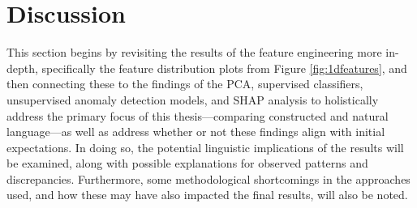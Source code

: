 \documentclass[12pt,a4paper]{article}
\numberwithin{figure}{section}
\numberwithin{table}{section}
\numberwithin{definition}{section}
\begin{document}
\clearpage
\newpage
\section{Discussion}
\label{sec:discussion}



This section begins by revisiting the results of the feature engineering more in-depth, specifically the feature distribution plots from Figure \ref{fig:1dfeatures}, and then connecting these to the findings of the PCA, supervised classifiers, unsupervised anomaly detection models, and SHAP analysis to holistically address the primary focus of this thesis---comparing constructed and natural language---as well as address whether or not these findings align with initial expectations. In doing so, the potential linguistic implications of the results will be examined, along with possible explanations for observed patterns and discrepancies. Furthermore, some methodological shortcomings in the approaches used, and how these may have also impacted the final results, will also be noted.
\end{document}
